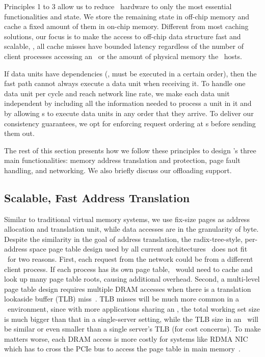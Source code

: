 Principles 1 to 3 allow us to reduce \MN\ hardware to only the most essential functionalities and state. 
We store the remaining state in off-chip memory and cache a fixed amount of them in on-chip memory.
Different from most caching solutions, our focus is to make the access to off-chip data structure fast and scalable,
\ie, all cache misses have bounded latency regardless of the number of client processes accessing an \MN\ or the amount of physical memory the \MN\ hosts.

If data units have dependencies (\eg, must be executed in a certain order), then the fast path cannot always execute a data unit when receiving it.
To handle one data unit per cycle and reach network line rate, we make each data unit independent by including all the information needed to process a unit in it and by allowing \MN{}s to execute data units in any order that they arrive.
To deliver our consistency guarantees, we opt for enforcing request ordering at \CN{}s before sending them out.

The rest of this section presents how we follow these principles to design \sys's three main functionalities: memory address translation and protection, page fault handling, and networking. We also briefly discuss our offloading support.

\subsection{Scalable, Fast Address Translation}
\label{sec:clio:addr-trans}
Similar to traditional virtual memory systems, we use fix-size pages as address allocation and translation unit, while data accesses are in the granularity of byte.
Despite the similarity in the goal of address translation,
the radix-tree-style, per-address space page table design used by all current architectures~\cite{ecuckoo-asplos20} does not fit \md\ for two reasons.
First, each request from the network could be from a different client process. If each process has its own page table, \MN\ would need to cache and look up many page table roots, causing additional overhead.
Second, a multi-level page table design requires multiple DRAM accesses when there is a translation lookaside buffer (TLB) miss~\cite{hashpgtable-sigmetrics16}.
TLB misses will be much more common in a \md\ environment, since with more applications sharing an \MN, the total working set size is much bigger than that in a single-server setting, while the TLB size in an \MN\ will be similar or even smaller than a single server's TLB (for cost concerns). To make matters worse, each DRAM access is more costly for systems like RDMA NIC which has to cross the PCIe bus to access the page table in main memory~\cite{Pythia,pcie-sigcomm}.

